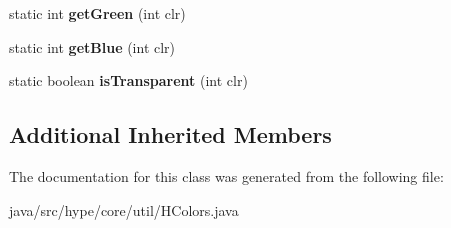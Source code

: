 \begin{DoxyCompactItemize}
\item 
\hypertarget{classhype_1_1core_1_1util_1_1_h_colors_a48ea544be73650414dcd56a112a04bfe}{static int {\bfseries get\-Green} (int clr)}\label{classhype_1_1core_1_1util_1_1_h_colors_a48ea544be73650414dcd56a112a04bfe}

\item 
\hypertarget{classhype_1_1core_1_1util_1_1_h_colors_a1800020b2bae22dc75a0b13f02c23d8f}{static int {\bfseries get\-Blue} (int clr)}\label{classhype_1_1core_1_1util_1_1_h_colors_a1800020b2bae22dc75a0b13f02c23d8f}

\item 
\hypertarget{classhype_1_1core_1_1util_1_1_h_colors_a301c2418d919af73193e673f7090027a}{static boolean {\bfseries is\-Transparent} (int clr)}\label{classhype_1_1core_1_1util_1_1_h_colors_a301c2418d919af73193e673f7090027a}

\end{DoxyCompactItemize}
\subsection*{Additional Inherited Members}


The documentation for this class was generated from the following file\-:\begin{DoxyCompactItemize}
\item 
java/src/hype/core/util/H\-Colors.\-java\end{DoxyCompactItemize}
